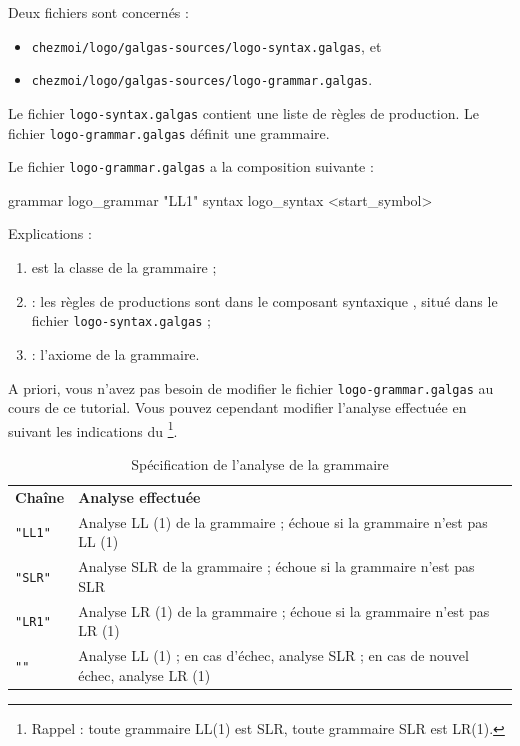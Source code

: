 Deux fichiers sont concernés :
\begin{itemize}
  \item \texttt{chezmoi/logo/galgas-sources/logo-syntax.galgas}, et
  \item \texttt{chezmoi/logo/galgas-sources/logo-grammar.galgas}.
\end{itemize}

Le fichier \texttt{logo-syntax.galgas} contient une liste de règles de production. Le fichier \texttt{logo-grammar.galgas} définit une grammaire.

Le fichier \texttt{logo-grammar.galgas} a la composition suivante :

\begin{galgascode}
grammar logo_grammar "LL1" {
  syntax logo_syntax
  <start_symbol>
}
\end{galgascode}

Explications :
\begin{enumerate}
  \item {} est la classe de la grammaire ;
  \item {} : les règles de productions sont dans le composant syntaxique , situé dans le fichier \texttt{logo-syntax.galgas} ; 
  \item {} : l'axiome de la grammaire.
\end{enumerate}

A priori, vous n'avez pas besoin de modifier le fichier \texttt{logo-grammar.galgas} au cours de ce tutorial. Vous pouvez cependant modifier l'analyse effectuée en suivant les indications du \footnote{Rappel : toute grammaire LL(1) est SLR, toute grammaire SLR est LR(1).}.

\begin{table}[t]
  \centering
  \begin{tabular}{ll}
    \textbf{Chaîne} & \textbf{Analyse effectuée} \\
    \texttt{"LL1"} & Analyse LL (1) de la grammaire ; échoue si la grammaire n'est pas LL (1) \\
    \texttt{"SLR"} & Analyse SLR de la grammaire ; échoue si la grammaire n'est pas SLR \\
    \texttt{"LR1"} & Analyse LR (1) de la grammaire ; échoue si la grammaire n'est pas LR (1) \\
    \texttt{""} & Analyse LL (1) ; en cas d'échec, analyse SLR ; en cas de nouvel échec, analyse LR (1) \\
  \end{tabular}
  \caption{Spécification de l'analyse de la grammaire}
  \ligne
\end{table}



